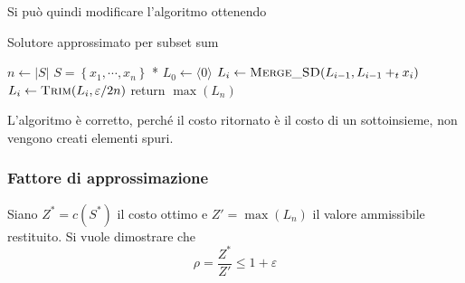 Si può quindi modificare l'algoritmo ottenendo
\begin{algorithm}[H]
\caption{Solutore approssimato per subset sum}\label{alg:ss_approx}
\begin{algorithmic}[1]
        \State $n \gets |S|$
        \State * $ S = \left\{ x_1, \cdots, x_n \right\} $ *
        \State $ L_0 \gets \langle 0 \rangle $
            \State $L_i \gets \Call{Merge\_SD}{
                        L_{i-1},
                        L_{i-1} \pt x_i
                    }$
            \State $L_i \gets \Call{Trim}{
                        L_{i},
                        \varepsilon / 2n
                    }$
        \EndFor
        \State return $\max (L_n)$
    \EndProcedure
\end{algorithmic}
\end{algorithm}

L'algoritmo è corretto, perché il costo ritornato è il costo di un sottoinsieme, non vengono creati elementi spuri.

\subsubsection{Fattore di approssimazione}

Siano $
Z^* = c (S^*)
$ il costo ottimo e $
Z' = \max \left( L_n \right)
$ il valore ammissibile restituito.
Si vuole dimostrare che
\begin{equation*}
    \rho = \frac{Z^*}{Z'} \leq 1 + \varepsilon
\end{equation*}

